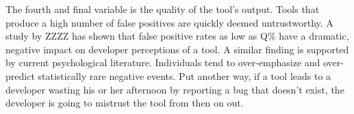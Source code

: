 
The fourth and final variable is the quality of the tool's output.  Tools
that produce a high number of false positives are quickly deemed
untrustworthy.  A study by ZZZZ has shown that false positive rates as low
as Q\% have a dramatic, negative impact on developer perceptions of a tool.
  A similar finding is supported by current psychological
literature.  Individuals tend to over-emphasize and over-predict
statistically rare negative events.  Put another way, if a
tool leads to a developer wasting his or her afternoon by reporting a bug
that doesn't exist, the developer is going to mistrust the tool from then
on out.

%


